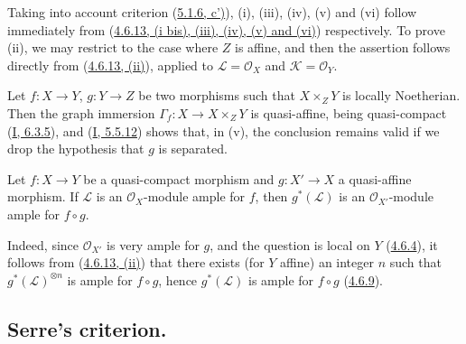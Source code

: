Taking into account criterion (\hyperref[II.5.1.6]{5.1.6, c')}), (i),
(iii), (iv), (v) and (vi) follow immediately from
(\hyperref[II.4.6.13]{4.6.13, (i bis), (iii), (iv), (v) and (vi)})
respectively. To prove (ii), we may restrict to the case where $Z$ is
affine, and then the assertion follows directly from
(\hyperref[II.4.6.13]{4.6.13, (ii)}), applied to
$\mathcal{L}=\mathcal{O}_X$ and $\mathcal{K}=\mathcal{O}_Y$.

\begin{remark}[5.1.11]
\label{II.5.1.11}
Let $f:X\to Y$, $g:Y\to Z$ be two morphisms such that $X\times_ZY$ is
locally Noetherian. Then the graph immersion
$\Gamma_f:X\to X\times_ZY$ is quasi-affine, being quasi-compact
(\hyperref[I.6.3.5]{I, 6.3.5}), and
(\hyperref[I.5.5.12]{I, 5.5.12}) shows that, in (v), the conclusion remains
valid if we drop the hypothesis that $g$ is separated.
\end{remark}

\begin{proposition}[5.1.12]
\label{II.5.1.12}
Let $f:X\to Y$ be a quasi-compact morphism and $g:X'\to X$ a quasi-affine
morphism. If $\mathcal{L}$ is an $\mathcal{O}_X$-module ample for
$f$, then $g^*(\mathcal{L})$ is an $\mathcal{O}_{X'}$-module ample for
$f\circ g$.
\end{proposition}

Indeed, since $\mathcal{O}_{X'}$ is very ample for $g$, and the
question is local on $Y$ (\hyperref[II.4.6.4]{4.6.4}), it follows from
(\hyperref[II.4.6.13]{4.6.13, (ii)}) that there exists (for $Y$ affine) an
integer $n$ such that $g^*(\mathcal{L})^{\otimes n}$ is ample for
$f\circ g$, hence $g^*(\mathcal{L})$ is ample for $f\circ g$
(\hyperref[II.4.6.9]{4.6.9}).


\subsection{Serre's criterion.}
\label{subsection:II.5.2}

